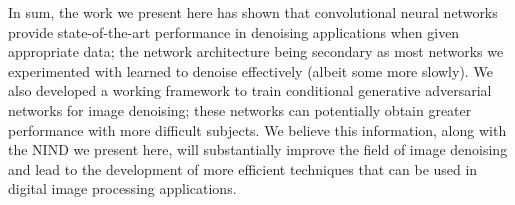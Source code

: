 In sum, the work we present here has shown that convolutional neural networks provide state-of-the-art performance in denoising applications when given appropriate data; the network architecture being secondary as most networks we experimented with learned to denoise effectively (albeit some more slowly). We also developed a working framework to train conditional generative adversarial networks for image denoising; these networks can potentially obtain greater performance with more difficult subjects. We believe this information, along with the \acl{NIND} we present here, will substantially improve the field of image denoising and lead to the development of more efficient techniques that can be used in digital image processing applications.





